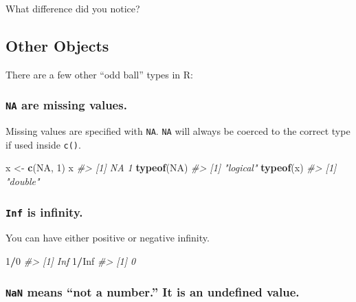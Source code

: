 \documentclass[]{book}
\newenvironment{Shaded}{\begin{snugshade}}{\end{snugshade}}
\newcommand{\KeywordTok}[1]{\textcolor[rgb]{0.13,0.29,0.53}{\textbf{#1}}}
\newcommand{\DecValTok}[1]{\textcolor[rgb]{0.00,0.00,0.81}{#1}}
\newcommand{\StringTok}[1]{\textcolor[rgb]{0.31,0.60,0.02}{#1}}
\newcommand{\CommentTok}[1]{\textcolor[rgb]{0.56,0.35,0.01}{\textit{#1}}}
\newcommand{\OtherTok}[1]{\textcolor[rgb]{0.56,0.35,0.01}{#1}}
\newcommand{\OperatorTok}[1]{\textcolor[rgb]{0.81,0.36,0.00}{\textbf{#1}}}
\newcommand{\NormalTok}[1]{#1}
\begin{document}
What difference did you notice?

\subsection{Other Objects}\label{other-objects}

There are a few other ``odd ball'' types in R:

\subsubsection*{\texorpdfstring{\texttt{NA} are missing
values.}{NA are missing values.}}\label{na-are-missing-values.}

Missing values are specified with \texttt{NA}. \texttt{NA} will always
be coerced to the correct type if used inside \texttt{c()}.

\begin{Shaded}
\begin{Highlighting}[]
\NormalTok{x <-}\StringTok{ }\KeywordTok{c}\NormalTok{(}\OtherTok{NA}\NormalTok{, }\DecValTok{1}\NormalTok{)}
\NormalTok{x}
\CommentTok{#> [1] NA  1}
\KeywordTok{typeof}\NormalTok{(}\OtherTok{NA}\NormalTok{)}
\CommentTok{#> [1] "logical"}
\KeywordTok{typeof}\NormalTok{(x)}
\CommentTok{#> [1] "double"}
\end{Highlighting}
\end{Shaded}

\subsubsection*{\texorpdfstring{\texttt{Inf} is
infinity.}{Inf is infinity.}}\label{inf-is-infinity.}

You can have either positive or negative infinity.

\begin{Shaded}
\begin{Highlighting}[]
\DecValTok{1}\OperatorTok{/}\DecValTok{0}
\CommentTok{#> [1] Inf}
\DecValTok{1}\OperatorTok{/}\OtherTok{Inf}
\CommentTok{#> [1] 0}
\end{Highlighting}
\end{Shaded}

\subsubsection*{\texorpdfstring{\texttt{NaN} means ``not a number.'' It
is an undefined
value.}{NaN means not a number. It is an undefined value.}}\label{nan-means-not-a-number.-it-is-an-undefined-value.}
\end{document}
